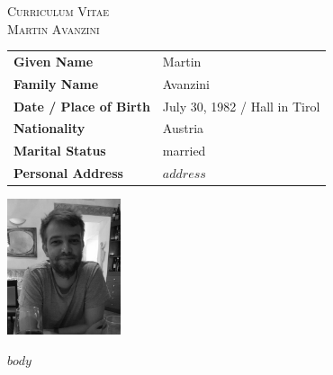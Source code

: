 \begin{center}
  {\LARGE \textsc{Curriculum Vitae}}\\[-1mm]
  {\textsc{Martin Avanzini}}
\end{center}

\vspace{1cm}

\begin{minipage}{0.70\linewidth}
\begin{tabular}{ll}
  \textbf{Given Name} & Martin\\
  \textbf{Family Name} & Avanzini \\ 
  \textbf{Date / Place of Birth} & July 30, 1982 / Hall in Tirol\\
  \textbf{Nationality} & Austria \\
  \textbf{Marital Status} & married\\
  \textbf{Personal Address} & $address$
\end{tabular}
\end{minipage}
\begin{minipage}{1\linewidth}
  \includegraphics[height=4cm]{images/me.jpg}
\end{minipage}

\vspace{1cm}

$body$
